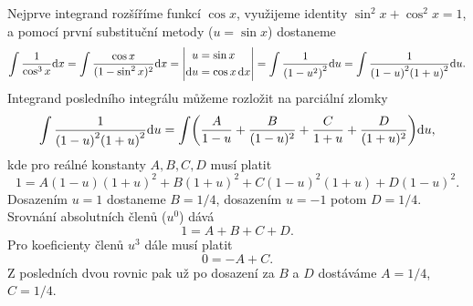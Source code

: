 \documentclass[answers]{exam}
\begin{document}
\begin{questions}
\begin{solution}
    Nejprve integrand rozšíříme funkcí $\cos x$, využijeme identity $\sin^2 x + \cos^2 x = 1$, a pomocí první substituční metody ($u = \sin x$) dostaneme
    \begin{equation*}
      \int \frac{1}{\cos^3 x} \diff x
      =
      \int \frac{\cos x}{(1 - \sin^2 x)^2} \diff x
      =
      \left| 
        \begin{aligned}
          u &= \sin x
          \\
          \diff u &= \cos x \, \diff x
        \end{aligned}
      \right|
      =
      \int \frac{1}{\parens{1-u^2}^2} \diff u
      =
      \int \frac{1}{\parens{1-u}^2 \parens{1+u}^2} \diff u.    
    \end{equation*}
    Integrand posledního integrálu můžeme rozložit na parciální zlomky
    \begin{equation*}
      \int \frac{1}{\parens{1-u}^2 \parens{1+u}^2} \diff u
      =
      \int
        \left(
          \frac{A}{1 - u} + \frac{B}{(1 - u)^2} + \frac{C}{1 + u} + \frac{D}{(1 + u)^2}
        \right)
      \diff u,
    \end{equation*}
    kde pro reálné konstanty $A, B, C, D$ musí platit
    \begin{equation*}
      1 = A (1 - u)(1 + u)^2 + B (1 + u)^2 + C (1 - u)^2 (1 + u) + D (1 - u)^2.
    \end{equation*}
    Dosazením $u = 1$ dostaneme $B = 1/4$, dosazením $u = -1$ potom $D = 1/4$. Srovnání absolutních členů ($u^0$) dává
    \begin{equation*}
      1 = A + B + C + D.
    \end{equation*}
    Pro koeficienty členů $u^3$ dále musí platit
    \begin{equation*}
      0 = -A + C.
    \end{equation*}
    Z posledních dvou rovnic pak už po dosazení za $B$ a $D$ dostáváme $A = 1/4$, $C = 1/4$.
    

\end{solution}
\end{questions}
\end{document}
